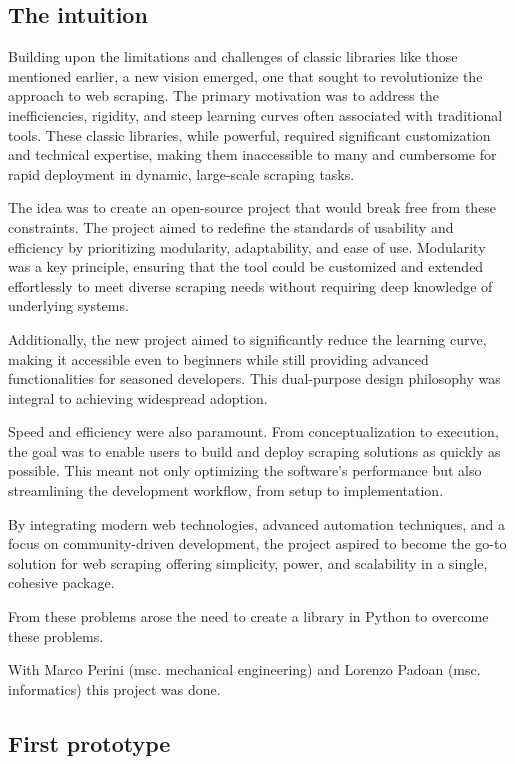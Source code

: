 \subsection{The intuition}
Building upon the limitations and challenges of classic libraries like those mentioned earlier, a new vision emerged, one that sought to revolutionize the approach to web scraping. The primary motivation was to address the inefficiencies, rigidity, and steep learning curves often associated with traditional tools. These classic libraries, while powerful, required significant customization and technical expertise, making them inaccessible to many and cumbersome for rapid deployment in dynamic, large-scale scraping tasks.

The idea was to create an open-source project that would break free from these constraints. The project aimed to redefine the standards of usability and efficiency by prioritizing modularity, adaptability, and ease of use. Modularity was a key principle, ensuring that the tool could be customized and extended effortlessly to meet diverse scraping needs without requiring deep knowledge of underlying systems.

Additionally, the new project aimed to significantly reduce the learning curve, making it accessible even to beginners while still providing advanced functionalities for seasoned developers. This dual-purpose design philosophy was integral to achieving widespread adoption.

Speed and efficiency were also paramount. From conceptualization to execution, the goal was to enable users to build and deploy scraping solutions as quickly as possible. This meant not only optimizing the software’s performance but also streamlining the development workflow, from setup to implementation.

By integrating modern web technologies, advanced automation techniques, and a focus on community-driven development, the project aspired to become the go-to solution for web scraping offering simplicity, power, and scalability in a single, cohesive package.

From these problems arose the need to create a library in Python to overcome these problems.

With Marco Perini (msc. mechanical engineering) and Lorenzo Padoan (msc. informatics) this project was done.
\subsection{First prototype}

